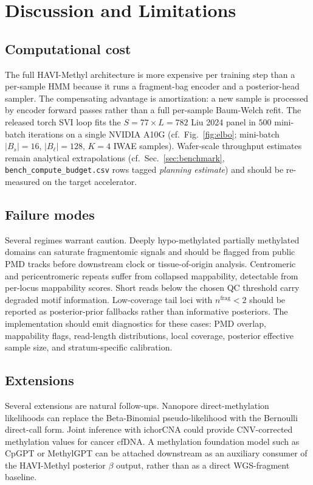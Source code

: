 \section{Discussion and Limitations}
\label{sec:discussion}

\subsection{Computational cost}
The full HAVI-Methyl architecture is more expensive per training step than a per-sample HMM because it runs a fragment-bag encoder and a posterior-head sampler. The compensating advantage is amortization: a new sample is processed by encoder forward passes rather than a full per-sample Baum-Welch refit. The released torch SVI loop fits the $S=77 \times L=782$ Liu 2024 panel in $500$ mini-batch iterations on a single NVIDIA A10G (cf.\ Fig.~\ref{fig:elbo}; mini-batch $|B_s|=16$, $|B_\ell|=128$, $K=4$ IWAE samples). Wafer-scale throughput estimates remain analytical extrapolations (cf.\ Sec.~\ref{sec:benchmark}, \texttt{bench\_compute\_budget.csv} rows tagged \emph{planning estimate}) and should be re-measured on the target accelerator.

\subsection{Failure modes}
Several regimes warrant caution. Deeply hypo-methylated partially methylated domains can saturate fragmentomic signals and should be flagged from public PMD tracks before downstream clock or tissue-of-origin analysis. Centromeric and pericentromeric repeats suffer from collapsed mappability, detectable from per-locus mappability scores. Short reads below the chosen QC threshold carry degraded motif information. Low-coverage tail loci with $n^{\mathrm{frag}}<2$ should be reported as posterior-prior fallbacks rather than informative posteriors. The implementation should emit diagnostics for these cases: PMD overlap, mappability flags, read-length distributions, local coverage, posterior effective sample size, and stratum-specific calibration.

\subsection{Extensions}
Several extensions are natural follow-ups. Nanopore direct-methylation likelihoods can replace the Beta-Binomial pseudo-likelihood with the Bernoulli direct-call form. Joint inference with ichorCNA \citep{adalsteinsson2017ichor} could provide CNV-corrected methylation values for cancer cfDNA. A methylation foundation model such as CpGPT or MethylGPT can be attached downstream as an auxiliary consumer of the HAVI-Methyl posterior $\beta$ output, rather than as a direct WGS-fragment baseline.

